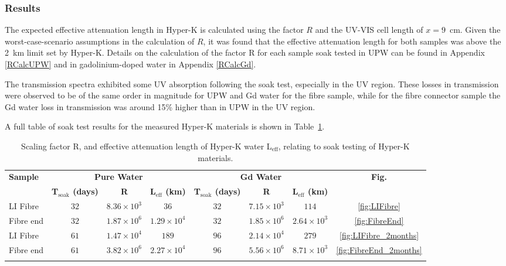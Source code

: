 \documentclass[a4paper,11pt]{article}
\newcommand{\hk}{Hyper-K\xspace}
\begin{document}
\subsubsection{Results}

The expected effective attenuation length in \hk is calculated using the factor $R$ and the UV-VIS cell length of $x=9$~cm. Given the worst-case-scenario assumptions in the calculation of $R$, it was found that the effective attenuation length for both samples was above the 2~km limit set by \hk. Details on the calculation of the factor R for each sample soak tested in UPW can be found in Appendix \ref{RCalcUPW} and in gadolinium-doped water in Appendix \ref{RCalcGd}.

The transmission spectra exhibited some UV absorption following the soak test, especially in the UV region. These losses in transmission were observed to be of the same order in magnitude for UPW and Gd water for the fibre sample, while for the fibre connector sample the Gd water loss in transmission was around 15\% higher than in UPW in the UV region. 

A full table of soak test results for the measured \hk materials is shown in Table~\ref{tab:soakresults}.

\begin{longtable}{lccccccc}
\hline
\multirow{2}{*}{\textbf{Sample}} & \multicolumn{3}{c}{\textbf{Pure Water}} & \multicolumn{3}{c}{\textbf{Gd Water}} & \multirow{2}{*}{\textbf{Fig.}} \\ \cmidrule(l){2-4} \cmidrule(l){5-7} 
& \textbf{T$_\text{soak}$ (days)} & \textbf{R} & \textbf{L$_\text{eff}$ (km)} & \textbf{T$_\text{soak}$ (days)} & \textbf{R} & \textbf{L$_\text{eff}$ (km)} &  \\ \hline
LI Fibre & $32$ & $8.36 \times 10^3$ & $36$ & $32$ & $7.15 \times 10^3$ & $114$ & \ref{fig:LIFibre} \\
Fibre end & $32$ & $1.87 \times 10^6$ & $1.29 \times 10^4$ & $32$ & $1.85 \times 10^6$ & $2.64 \times 10^3$ & \ref{fig:FibreEnd} \\
LI Fibre & $61$ & $1.47 \times 10^4$ & $189$ & $96$ & $2.14 \times 10^4$ & $279$ & \ref{fig:LIFibre_2months} \\
Fibre end & $61$ & $3.82 \times 10^6$ & $2.27 \times 10^4$ & $96$ & $5.56 \times 10^6$ & $8.71 \times 10^3$ & \ref{fig:FibreEnd_2months} \\
\hline
\caption{Scaling factor R, and effective attenuation length of \hk water L$_\text{eff}$, relating to soak testing of \hk materials. }
\label{tab:soakresults}
\end{longtable}
\end{document}
